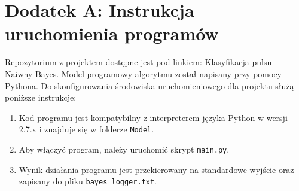 \section{Dodatek A: Instrukcja uruchomienia programów}
\label{dodatekA}

Repozytorium z projektem dostępne jest pod linkiem: \href{https://github.com/kamilfocus/ESDMiT-Naive-Bayes}{Klasyfikacja pulsu - Naiwny Bayes}. Model programowy algorytmu został napisany przy pomocy Pythona. Do skonfigurowania środowiska uruchomieniowego dla projektu służą poniższe instrukcje:

\begin{enumerate}
	\item Kod programu jest kompatybilny z interpreterem języka Python w wersji 2.7.x i znajduje się w folderze \texttt{Model}.
	\item Aby włączyć program, należy uruchomić skrypt \texttt{main.py}.
	\item Wynik działania programu jest przekierowany na standardowe wyjście oraz zapisany do pliku \texttt{bayes\_logger.txt}.
\end{enumerate}
